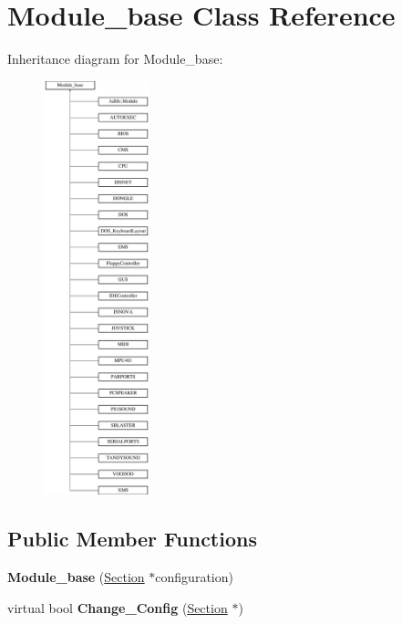 \hypertarget{classModule__base}{\section{Module\-\_\-base Class Reference}
\label{classModule__base}
}
Inheritance diagram for Module\-\_\-base\-:\begin{figure}[H]
\begin{center}
\leavevmode
\includegraphics[height=12.000000cm]{classModule__base}
\end{center}
\end{figure}
\subsection*{Public Member Functions}
\begin{DoxyCompactItemize}
\item 
\hypertarget{classModule__base_adb09c0f382c0a6fad5e74732967c23b5}{{\bfseries Module\-\_\-base} (\hyperlink{classSection}{Section} $\ast$configuration)}\label{classModule__base_adb09c0f382c0a6fad5e74732967c23b5}

\item 
\hypertarget{classModule__base_ab948d0418d642d256c5987f335ded21f}{virtual bool {\bfseries Change\-\_\-\-Config} (\hyperlink{classSection}{Section} $\ast$)}\label{classModule__base_ab948d0418d642d256c5987f335ded21f}

\end{DoxyCompactItemize}
